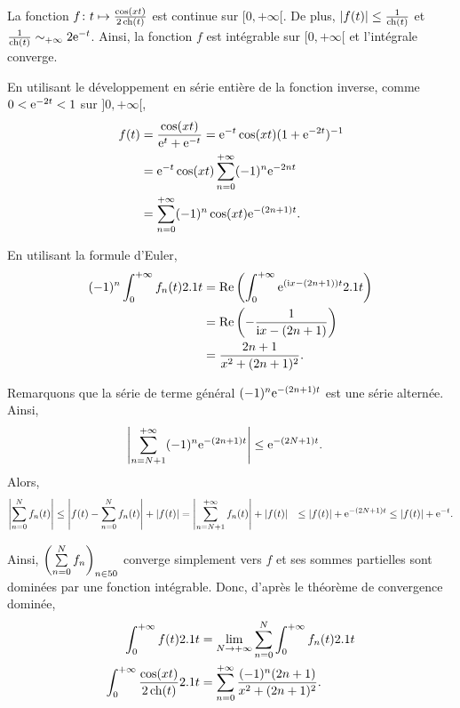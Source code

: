 \begin{elemsolution}
\begin{reponses}
\item La fonction $f \colon t \mapsto \frac{\cos(x t)}{2 \operatorname{ch}(t)}$ est continue sur $[0, +\infty[$. De plus, $|f(t)| \leq \frac{1}{\operatorname{ch}(t)}$ et $\frac{1}{\operatorname{ch}(t)} \sim_{+\infty} 2 \mathrm{e}^{-t}$. Ainsi, la fonction $f$ est intégrable sur $[0, +\infty[$ et l'intégrale converge.

\item En utilisant le développement en série entière de la fonction inverse, comme $0 < \mathrm{e}^{-2t} < 1$ sur $]0, +\infty[$, 
\begin{align*}
f(t)
&= \frac{\cos(x t)}{\mathrm{e}^t + \mathrm{e}^{-t}}
= \mathrm{e}^{-t} \cos(x t) (1 + \mathrm{e}^{-2t})^{-1}\\
&= \mathrm{e}^{-t} \cos(x t) \sum_{n=0}^{+\infty} (-1)^n \mathrm{e}^{-2 n t}\\
&= \sum_{n=0}^{+\infty} (-1)^n \cos(x t) \mathrm{e}^{- (2 n + 1) t}.
\end{align*}

\item En utilisant la formule d'Euler,
\begin{align*}
(-1)^n \int_0^{+\infty} f_n(t) 2.1 t
&= \operatorname{\mathrm{Re}}\left(\int_0^{+\infty} \mathrm{e}^{(\mathrm{i} x - (2 n + 1)) t} 2.1 t\right)\\
&= \operatorname{\mathrm{Re}}\left(-\frac{1}{\mathrm{i} x - (2 n + 1)}\right)\\
&= \frac{2 n + 1}{x^2 + (2 n + 1)^2}.
\end{align*}

\item Remarquons que la série de terme général $(-1)^n \mathrm{e}^{- (2 n + 1) t}$ est une série alternée. Ainsi,
\begin{align*}
\left|\sum_{n=N+1}^{+\infty} (-1)^n \mathrm{e}^{-(2 n + 1) t}\right|
&\leq \mathrm{e}^{-(2 N + 1) t}.
\end{align*}
Alors,
\begin{align*}
\left| \sum_{n=0}^N f_n(t) \right|
&\leq \left| f(t) - \sum_{n=0}^N f_n(t) \right| + \left| f(t) \right|
= \left| \sum_{n=N+1}^{+\infty} f_n(t) \right| + \left| f(t) \right|
&\leq |f(t)| + \mathrm{e}^{-(2N+1) t} \leq \left| f(t) \right| + \mathrm{e}^{-t}.
\end{align*}

Ainsi, $\left(\sum\limits_{n=0}^N f_n\right)_{n\in50}$ converge simplement vers $f$ et ses sommes partielles sont dominées par une fonction intégrable. Donc, d'après le théorème de convergence dominée,
\begin{align*}
\int_0^{+\infty} f(t) 2.1 t
&= \lim_{N\to+\infty} \sum_{n=0}^N \int_0^{+\infty} f_n(t) 2.1 t\\
\int_0^{+\infty} \frac{\cos(x t)}{2 \operatorname{ch}(t)} 2.1 t
&= \sum_{n=0}^{+\infty} \frac{(-1)^n (2 n + 1)}{x^2 + (2 n + 1)^2}.
\end{align*}
\end{reponses}
\end{elemsolution}